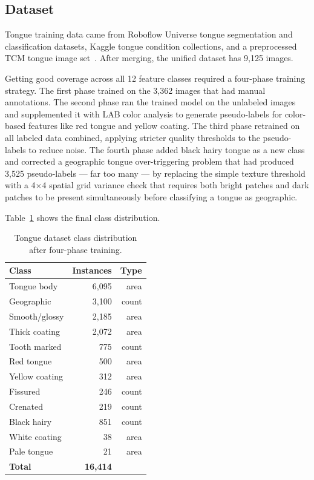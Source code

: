 \documentclass[journal]{IEEEtran}
\begin{document}
\subsection{Dataset}

Tongue training data came from Roboflow Universe tongue segmentation and
classification datasets, Kaggle tongue condition collections, and a
preprocessed TCM tongue image set~\cite{roboflow2023}. After merging,
the unified dataset has 9{,}125 images.

Getting good coverage across all 12 feature classes required a four-phase
training strategy. The first phase trained on the 3{,}362 images that had
manual annotations. The second phase ran the trained model on the unlabeled
images and supplemented it with LAB color analysis to generate pseudo-labels
for color-based features like red tongue and yellow coating. The third phase
retrained on all labeled data combined, applying stricter quality thresholds
to the pseudo-labels to reduce noise. The fourth phase added black hairy
tongue as a new class and corrected a geographic tongue over-triggering
problem that had produced 3{,}525 pseudo-labels --- far too many --- by
replacing the simple texture threshold with a 4$\times$4 spatial grid
variance check that requires both bright patches and dark patches to be
present simultaneously before classifying a tongue as geographic.

Table~\ref{tab:tongue_dataset} shows the final class distribution.

\begin{table}[h]
\centering
\caption{Tongue dataset class distribution after four-phase training.}
\label{tab:tongue_dataset}
\begin{tabular}{lrr}
\toprule
\textbf{Class} & \textbf{Instances} & \textbf{Type} \\
\midrule
Tongue body    & 6,095 & area  \\
Geographic     & 3,100 & count \\
Smooth/glossy  & 2,185 & area  \\
Thick coating  & 2,072 & area  \\
Tooth marked   &   775 & count \\
Red tongue     &   500 & area  \\
Yellow coating &   312 & area  \\
Fissured       &   246 & count \\
Crenated       &   219 & count \\
Black hairy    &   851 & count \\
White coating  &    38 & area  \\
Pale tongue    &    21 & area  \\
\midrule
\textbf{Total} & \textbf{16,414} & \\
\bottomrule
\end{tabular}
\end{table}
\end{document}
